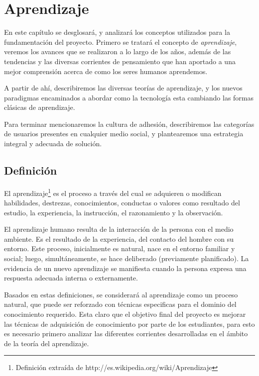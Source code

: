 \chapter{Aprendizaje}

En este capítulo se desglosará, y analizará los conceptos utilizados para la
fundamentación del proyecto. Primero se tratará el concepto de
\emph{aprendizaje}, veremos los avances que se realizaron a lo largo de los
años, además de las tendencias y las diversas corrientes de pensamiento que han
aportado a una mejor comprensión acerca de como los seres humanos aprendemos.

A partir de ahí, describiremos las diversas teorías de aprendizaje, y los nuevos
paradigmas encaminados a abordar como la tecnología esta cambiando las formas
clásicas de aprendizaje.

Para terminar mencionaremos la cultura de adhesión, describiremos las categorías
de usuarios presentes en cualquier medio social, y plantearemos una estrategia
integral y adecuada de solución.

\section{Definición}

El aprendizaje\footnote{Definición extraída de
http://es.wikipedia.org/wiki/Aprendizaje} es el proceso a través del cual se
adquieren o modifican habilidades, destrezas, conocimientos, conductas o valores
como resultado del estudio, la experiencia, la instrucción, el razonamiento y la
observación.

El aprendizaje humano resulta de la interacción de la persona con el medio
ambiente. Es el resultado de la experiencia, del contacto del hombre con su
entorno. Este proceso, inicialmente es natural, nace en el entorno familiar y
social; luego, simultáneamente, se hace deliberado (previamente planificado).
La evidencia de un nuevo aprendizaje se manifiesta cuando la persona expresa
una respuesta adecuada interna o externamente\cite{Rojas}.

Basados en estas definiciones, se considerará al aprendizaje como un proceso
natural, que puede ser reforzado con técnicas especificas para el dominio del 
conocimiento requerido. Esta claro que el objetivo final del proyecto es mejorar
las técnicas de adquisición de conocimiento por parte de los estudiantes, para
esto es necesario primero analizar las diferentes corrientes desarrolladas en el
ámbito de la teoría del aprendizaje.


